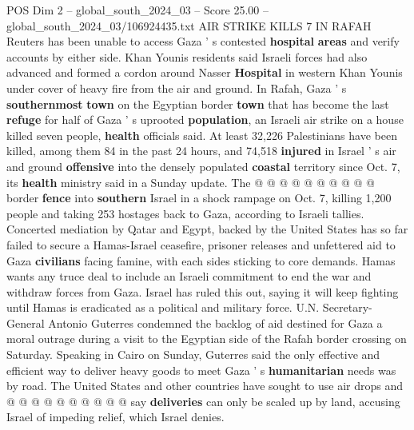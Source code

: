 \begin{textsample}{POS Dim 2 – global\_south\_2024\_03 – Score 25.00 – global\_south\_2024\_03/106924435.txt}
AIR STRIKE KILLS 7 IN RAFAH Reuters has been unable to access Gaza ' s contested \textbf{hospital} \textbf{areas} and verify accounts by either side.
Khan Younis residents said Israeli forces had also advanced and formed a cordon around Nasser \textbf{Hospital} in western Khan Younis under cover of heavy fire from the air and ground.
In Rafah, Gaza ' s \textbf{southernmost} \textbf{town} on the Egyptian border \textbf{town} that has become the last \textbf{refuge} for half of Gaza ' s uprooted \textbf{population}, an Israeli air strike on a house killed seven people, \textbf{health} officials said.
At least 32,226 Palestinians have been killed, among them 84 in the past 24 hours, and 74,518 \textbf{injured} in Israel ' s air and ground \textbf{offensive} into the densely populated \textbf{coastal} territory since Oct. 7, its \textbf{health} ministry said in a Sunday update.
The @ @ @ @ @ @ @ @ @ @ border \textbf{fence} into \textbf{southern} Israel in a shock rampage on Oct. 7, killing 1,200 people and taking 253 hostages back to Gaza, according to Israeli tallies.
Concerted mediation by Qatar and Egypt, backed by the United States has so far failed to secure a Hamas-Israel ceasefire, prisoner releases and unfettered aid to Gaza \textbf{civilians} facing famine, with each sides sticking to core demands.
Hamas wants any truce deal to include an Israeli commitment to end the war and withdraw forces from Gaza.
Israel has ruled this out, saying it will keep fighting until Hamas is eradicated as a political and military force.
U.N.
Secretary-General Antonio Guterres condemned the backlog of aid destined for Gaza a moral outrage during a visit to the Egyptian side of the Rafah border crossing on Saturday.
Speaking in Cairo on Sunday, Guterres said the only effective and efficient way to deliver heavy goods to meet Gaza ' s \textbf{humanitarian} needs was by road.
The United States and other countries have sought to use air drops and @ @ @ @ @ @ @ @ @ @ say \textbf{deliveries} can only be scaled up by land, accusing Israel of impeding relief, which Israel denies.

\end{textsample}
